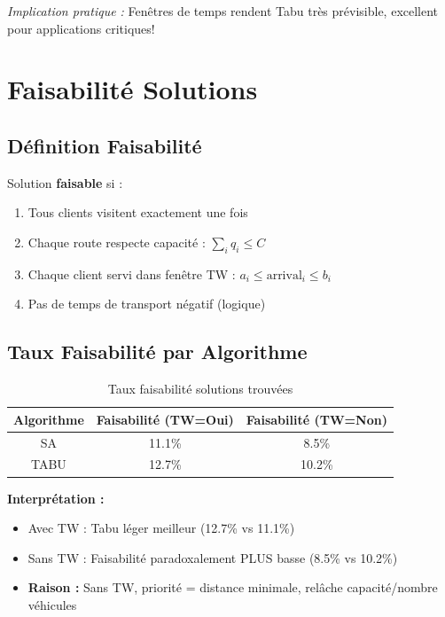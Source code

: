 \documentclass[12pt,a4paper,twoside]{report}
\begin{document}
\textit{Implication pratique :} Fenêtres de temps rendent Tabu très prévisible, excellent pour applications critiques!

\section{Faisabilité Solutions}

\subsection{Définition Faisabilité}

Solution \textbf{faisable} si :
\begin{enumerate}
    \item Tous clients visitent exactement une fois
    \item Chaque route respecte capacité : $\sum_i q_i \leq C$
    \item Chaque client servi dans fenêtre TW : $a_i \leq \text{arrival}_i \leq b_i$
    \item Pas de temps de transport négatif (logique)
\end{enumerate}

\subsection{Taux Faisabilité par Algorithme}

\begin{table}[H]
    \centering
    \caption{Taux faisabilité solutions trouvées}
    \begin{tabular}{|c|c|c|}
        \hline
        \textbf{Algorithme} & \textbf{Faisabilité (TW=Oui)} & \textbf{Faisabilité (TW=Non)} \\
        \hline
        SA                  & 11.1\%                        & 8.5\%                         \\
        TABU                & 12.7\%                        & 10.2\%                        \\
        \hline
    \end{tabular}
\end{table}

\textbf{Interprétation :}

\begin{itemize}
    \item Avec TW : Tabu léger meilleur (12.7\% vs 11.1\%)
    \item Sans TW : Faisabilité paradoxalement PLUS basse (8.5\% vs 10.2\%)
    \item \textbf{Raison :} Sans TW, priorité = distance minimale, relâche capacité/nombre véhicules
\end{itemize}
\end{document}
